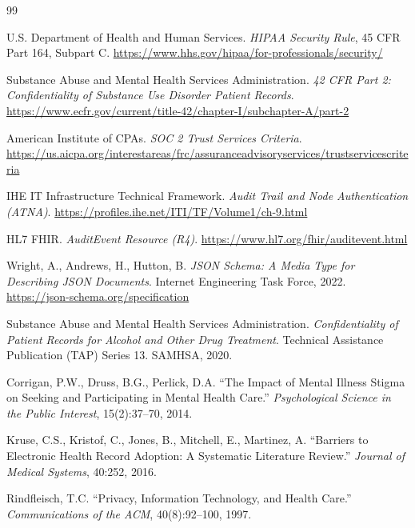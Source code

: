\documentclass[11pt,a4paper]{article}
\begin{document}
\begin{thebibliography}{99}

U.S. Department of Health and Human Services.
\textit{HIPAA Security Rule}, 45 CFR Part 164, Subpart C.
\url{https://www.hhs.gov/hipaa/for-professionals/security/}

Substance Abuse and Mental Health Services Administration.
\textit{42 CFR Part 2: Confidentiality of Substance Use Disorder Patient Records}.
\url{https://www.ecfr.gov/current/title-42/chapter-I/subchapter-A/part-2}

American Institute of CPAs.
\textit{SOC 2 Trust Services Criteria}.
\url{https://us.aicpa.org/interestareas/frc/assuranceadvisoryservices/trustservicescriteria}

IHE IT Infrastructure Technical Framework.
\textit{Audit Trail and Node Authentication (ATNA)}.
\url{https://profiles.ihe.net/ITI/TF/Volume1/ch-9.html}

HL7 FHIR.
\textit{AuditEvent Resource (R4)}.
\url{https://www.hl7.org/fhir/auditevent.html}

Wright, A., Andrews, H., Hutton, B.
\textit{JSON Schema: A Media Type for Describing JSON Documents}.
Internet Engineering Task Force, 2022.
\url{https://json-schema.org/specification}

Substance Abuse and Mental Health Services Administration.
\textit{Confidentiality of Patient Records for Alcohol and Other Drug Treatment}.
Technical Assistance Publication (TAP) Series 13. SAMHSA, 2020.

Corrigan, P.W., Druss, B.G., Perlick, D.A.
``The Impact of Mental Illness Stigma on Seeking and Participating in Mental Health Care.''
\textit{Psychological Science in the Public Interest}, 15(2):37--70, 2014.

Kruse, C.S., Kristof, C., Jones, B., Mitchell, E., Martinez, A.
``Barriers to Electronic Health Record Adoption: A Systematic Literature Review.''
\textit{Journal of Medical Systems}, 40:252, 2016.

Rindfleisch, T.C.
``Privacy, Information Technology, and Health Care.''
\textit{Communications of the ACM}, 40(8):92--100, 1997.

\end{thebibliography}
\end{document}
